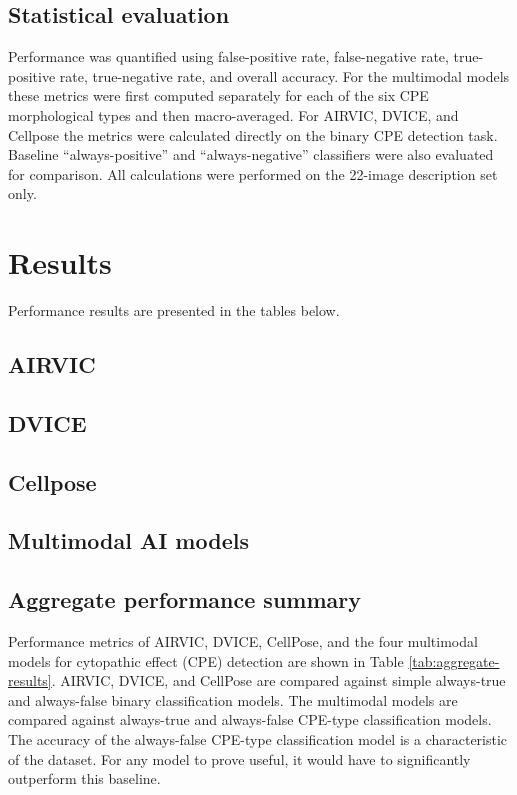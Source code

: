 \documentclass[12pt,a4paper]{article}
\begin{document}
\subsection{Statistical evaluation}
Performance was quantified using false-positive rate, false-negative rate, true-positive rate, true-negative rate, and overall accuracy. For the multimodal models these metrics were first computed separately for each of the six CPE morphological types and then macro-averaged. For AIRVIC, DVICE, and Cellpose the metrics were calculated directly on the binary CPE detection task. Baseline ``always-positive'' and ``always-negative'' classifiers were also evaluated for comparison. All calculations were performed on the 22-image description set only.

\section{Results}
Performance results are presented in the tables below.

\subsection{AIRVIC}


\subsection{DVICE}



\subsection{Cellpose}



\subsection{Multimodal AI models}


\subsection{Aggregate performance summary}
Performance metrics of AIRVIC, DVICE, CellPose, and the four multimodal models for cytopathic effect (CPE) detection are shown in Table \ref{tab:aggregate-results}. AIRVIC, DVICE, and CellPose are compared against simple always-true and always-false binary classification models. The multimodal models are compared against always-true and always-false CPE-type classification models. The accuracy of the always-false CPE-type classification model is a characteristic of the dataset. For any model to prove useful, it would have to significantly outperform this baseline.
\end{document}
